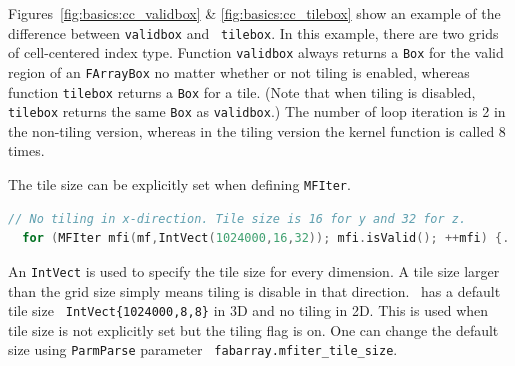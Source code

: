 {{Figures~\ref{fig:basics:cc_validbox} \& \ref{fig:basics:cc_tilebox}
show an example of the difference between {\tt validbox} and {\tt
  tilebox}.  In this example, there are two grids of cell-centered
index type.  Function {\tt validbox} always returns a {\tt Box} for the
valid region of an {\tt FArrayBox} no matter whether or not tiling is
enabled, whereas function {\tt tilebox} returns a {\tt Box} for a
tile.  (Note that when tiling is disabled, {\tt tilebox} returns the
same {\tt Box} as {\tt validbox}.)  The number of loop iteration is 2
in the non-tiling version, whereas in the tiling version the kernel
function is called 8 times.

The tile size can be explicitly set when defining {\tt MFIter}.
\begin{lstlisting}[language=cpp]
  // No tiling in x-direction. Tile size is 16 for y and 32 for z.
  for (MFIter mfi(mf,IntVect(1024000,16,32)); mfi.isValid(); ++mfi) {...}
\end{lstlisting}
An {\tt IntVect} is used to specify the tile size for every dimension.
A tile size larger than the grid size simply means tiling is disable
in that direction.  \amrex\ has a default tile size {\tt
  IntVect\{1024000,8,8\}} in 3D and no tiling in 2D.  This is used
when tile size is not explicitly set but the tiling flag is on.  One
can change the default size using {\tt ParmParse} parameter {\tt
  fabarray.mfiter\_tile\_size}.

}}
